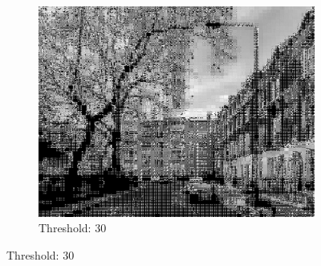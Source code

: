 \documentclass{article}
\begin{document}
\begin{figure}[htbp]
\begin{subfigure}{0.3\textwidth}
    \end{subfigure}\hfill
    \begin{subfigure}{0.3\textwidth}
        \centering
        \includegraphics[width=\linewidth]{RECONSTRUCTED30.jpeg}
        \caption{Threshold: 30}
    \end{subfigure}

    \vspace{0.5cm}


\end{figure}
\end{document}

